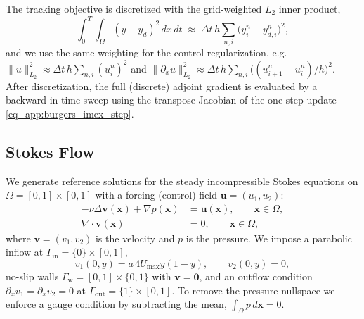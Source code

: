 \documentclass[final,1p,times]{elsarticle}
\theoremstyle{plain} %
\theoremstyle{definition} %
\theoremstyle{remark} %
\begin{document}
The tracking objective is discretized with the grid-weighted $L_2$ inner product,
\begin{equation}\label{eq_app:burgers_misfit_disc}
\int_0^T\!\!\int_\Omega (y-y_d)^2\,dx\,dt
\;\approx\;
\Delta t\,h \sum_{n,i}\bigl(y_i^n-y_{d,i}^n\bigr)^2,
\end{equation}
and we use the same weighting for the control regularization,
e.g. $\|u\|_{L_2}^2 \approx \Delta t\,h\sum_{n,i}(u_i^n)^2$ and
$\|\partial_x u\|_{L_2}^2 \approx \Delta t\,h\sum_{n,i}\bigl((u_{i+1}^n-u_i^n)/h\bigr)^2$.
After discretization, the full (discrete) adjoint gradient is evaluated by a backward-in-time sweep
using the transpose Jacobian of the one-step update \eqref{eq_app:burgers_imex_step}.

\subsection{Stokes Flow}

We generate reference solutions for the steady incompressible Stokes equations on
$\Omega=[0,1]\times[0,1]$ with a forcing (control) field $\mathbf{u}=(u_1,u_2)$:
\begin{equation}\label{eq_app:stokes}
\begin{aligned}
-\nu \Delta \mathbf{v}(\mathbf{x}) + \nabla p(\mathbf{x}) &= \mathbf{u}(\mathbf{x}),
\qquad \mathbf{x}\in\Omega,\\
\nabla\cdot \mathbf{v}(\mathbf{x}) &= 0, \qquad \mathbf{x}\in\Omega,
\end{aligned}
\end{equation}
where $\mathbf{v}=(v_1,v_2)$ is the velocity and $p$ is the pressure. We impose a parabolic inflow at
$\Gamma_{\mathrm{in}}=\{0\}\times[0,1]$,
\begin{equation}\label{eq_app:stokes_inlet}
v_1(0,y)=a\,4U_{\max}y(1-y),\qquad v_2(0,y)=0,
\end{equation}
no-slip walls $\Gamma_{\mathrm{w}}=[0,1]\times\{0,1\}$ with $\mathbf{v}=\mathbf{0}$, and an outflow
condition $\partial_x v_1=\partial_x v_2=0$ at $\Gamma_{\mathrm{out}}=\{1\}\times[0,1]$. To remove the
pressure nullspace we enforce a gauge condition by subtracting the mean, $\int_\Omega p\,d\mathbf{x}=0$.
\end{document}
